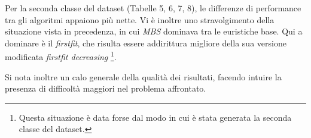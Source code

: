 \documentclass{article}
\begin{document}
 \begin{table}[H]
    \caption{Binpack3}
 \end{table}
 
  \begin{table}[H]
    \caption{Binpack4}
 \end{table}
 
Per la seconda classe del dataset (Tabelle 5, 6, 7, 8), le differenze di performance tra gli algoritmi appaiono più nette. Vi è inoltre uno stravolgimento della situazione vista in precedenza, in cui \textit{MBS} dominava tra le euristiche base. Qui a dominare è il \textit{firstfit}, che risulta essere addirittura migliore della sua versione modificata \textit{firstfit decreasing} \footnote{Questa situazione è data forse dal modo in cui è stata generata la seconda classe del dataset.\cite{Falkenauer}}.


Si nota inoltre un calo generale della qualità dei risultati, facendo intuire la presenza di difficoltà maggiori nel problema affrontato.
 
\end{document}
